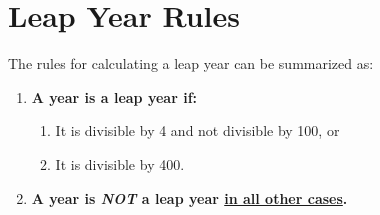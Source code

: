 \documentclass{article}
\begin{document}
\section{Leap Year Rules}
The rules for calculating a leap year can be summarized as:
\begin{enumerate}
    \item \textbf{A year is a leap year if:}
    \begin{enumerate}
        \item It is divisible by 4 and not divisible by 100, or
        \item It is divisible by 400.
    \end{enumerate}
    \item \textbf{A year is \textit{NOT} a leap year \underline{in all other cases}.}
\end{enumerate}
\end{document}
